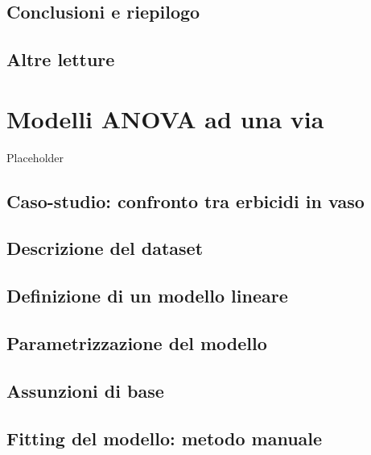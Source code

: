 \documentclass[a4paper,12pt,oneside]{book}
\begin{document}
\hypertarget{conclusioni-e-riepilogo}{%
\section{Conclusioni e riepilogo}\label{conclusioni-e-riepilogo}}

\hypertarget{altre-letture-5}{%
\section{Altre letture}\label{altre-letture-5}}

\hypertarget{modelli-anova-ad-una-via}{%
\chapter{Modelli ANOVA ad una via}\label{modelli-anova-ad-una-via}}

Placeholder

\hypertarget{caso-studio-confronto-tra-erbicidi-in-vaso}{%
\section{Caso-studio: confronto tra erbicidi in vaso}\label{caso-studio-confronto-tra-erbicidi-in-vaso}}

\hypertarget{descrizione-del-dataset}{%
\section{Descrizione del dataset}\label{descrizione-del-dataset}}

\hypertarget{definizione-di-un-modello-lineare}{%
\section{Definizione di un modello lineare}\label{definizione-di-un-modello-lineare}}

\hypertarget{parametrizzazione-del-modello}{%
\section{Parametrizzazione del modello}\label{parametrizzazione-del-modello}}

\hypertarget{assunzioni-di-base}{%
\section{Assunzioni di base}\label{assunzioni-di-base}}

\hypertarget{fitting-del-modello-metodo-manuale}{%
\section{Fitting del modello: metodo manuale}\label{fitting-del-modello-metodo-manuale}}
\end{document}
